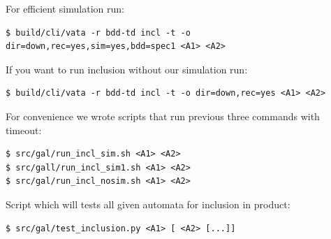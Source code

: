 \documentclass[a4paper, 12pt]{article}
\begin{document}
For efficient simulation run:
\begin{verbatim}
$ build/cli/vata -r bdd-td incl -t -o dir=down,rec=yes,sim=yes,bdd=spec1 <A1> <A2>
\end{verbatim}


If you want to run inclusion without our simulation run:
\begin{verbatim}
$ build/cli/vata -r bdd-td incl -t -o dir=down,rec=yes <A1> <A2>
\end{verbatim}

For convenience we wrote scripts that run previous three commands with timeout:
\begin{verbatim}
$ src/gal/run_incl_sim.sh <A1> <A2>
$ src/gall/run_incl_sim1.sh <A1> <A2>
$ src/gal/run_incl_nosim.sh <A1> <A2>
\end{verbatim}

Script which will tests all given automata for inclusion in product:
\begin{verbatim}
$ src/gal/test_inclusion.py <A1> [ <A2> [...]]
\end{verbatim}

\newpage
 


\end{document}
